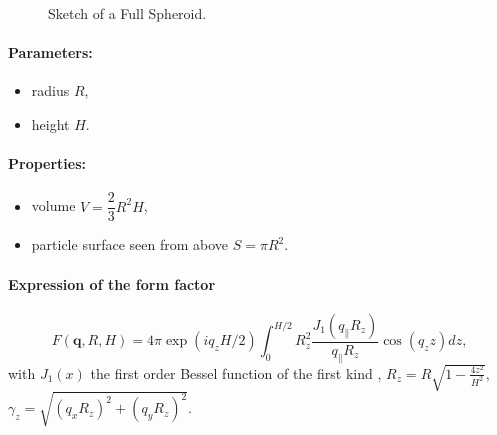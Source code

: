 \begin{figure}[ht]
\hfill
{}
\hfill
{}
\hfill
\caption{Sketch of a Full Spheroid. }
\label{fig:fullspheroid}
\end{figure}

\FloatBarrier

\paragraph{Parameters:}
\begin{itemize}
\item radius $R$,
\item height $H$.
\end{itemize}

\paragraph{Properties:}
\begin{itemize}
\item volume $V =\dfrac{2}{3}R^2H$,
\item particle surface seen from above $S =\pi R^2$. 
\end{itemize}

\paragraph{Expression of the form factor}
\begin{equation*}
F(\mathbf{q}, R, H) = 4\pi \exp(i q_z H/2) \int_0 ^{H/2}R_z ^2
\frac{J_1(q_{\parallel}R_z)}{q_{\parallel}R_z} \cos(q_z z) dz,
\end{equation*}
with $J_1(x)$ the first order
Bessel function of the first kind \cite{AbSt64},
$R_z = R\sqrt{1-\frac{4z^2}{H^2}}$, $\gamma_z = \sqrt{(q_x R_z)^2+(q_y R_z)^2}$.


